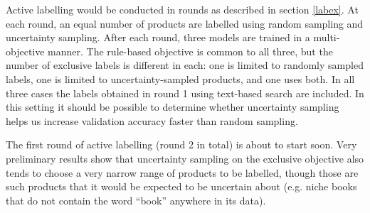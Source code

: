 Active labelling would be conducted in rounds as described in section \ref{labex}.
At each round, an equal number of products are labelled using random sampling and uncertainty sampling.
After each round, three models are trained in a multi-objective manner.
The rule-based objective is common to all three, but the number of exclusive labels is different in each: one is limited to randomly sampled labels, one is limited to uncertainty-sampled products, and one uses both.
In all three cases the labels obtained in round 1 using text-based search are included.
In this setting it should be possible to determine whether uncertainty sampling helps us increase validation accuracy faster than random sampling.

The first round of active labelling (round 2 in total) is about to start soon.
Very preliminary results show that uncertainty sampling on the exclusive objective also tends to choose a very narrow range of products to be labelled, though those are such products that it would be expected to be uncertain about (e.g. niche books that do not contain the word ``book'' anywhere in its data).

